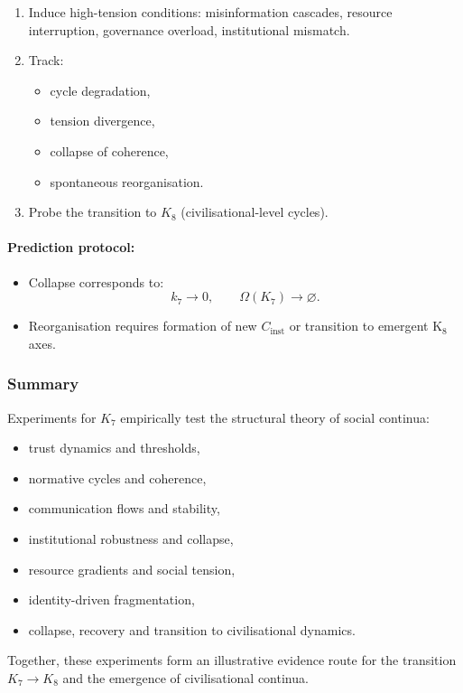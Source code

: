 \begin{enumerate}
    \item Induce high-tension conditions:
          misinformation cascades, resource interruption,
          governance overload, institutional mismatch.
    \item Track:
          \begin{itemize}
              \item cycle degradation,
              \item tension divergence,
              \item collapse of coherence,
              \item spontaneous reorganisation.
          \end{itemize}
    \item Probe the transition to $K_8$ (civilisational-level cycles).
\end{enumerate}

\paragraph{Prediction protocol:}

\begin{itemize}
    \item Collapse corresponds to:
          \[
             k_7 \rightarrow 0,\qquad
             \Omega(K_7) \rightarrow \varnothing.
          \]
    \item Reorganisation requires formation of new $C_{\mathrm{inst}}$
          or transition to emergent K$_8$ axes.
\end{itemize}



\subsubsection{Summary}

Experiments for $K_7$ empirically test the structural theory of
social continua:

\begin{itemize}
    \item trust dynamics and thresholds,
    \item normative cycles and coherence,
    \item communication flows and stability,
    \item institutional robustness and collapse,
    \item resource gradients and social tension,
    \item identity-driven fragmentation,
    \item collapse, recovery and transition to civilisational dynamics.
\end{itemize}

Together, these experiments form an illustrative evidence route for the
transition $K_7 \rightarrow K_8$ and the emergence of civilisational
continua.
